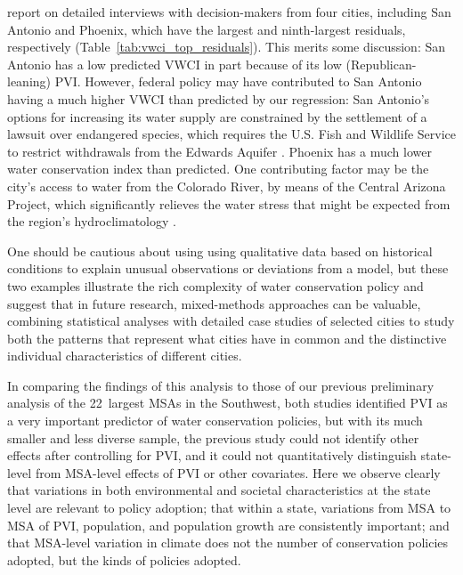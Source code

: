 \documentclass[draft,linenumbers]{agujournal}
\begin{document}
\citet{brown:politics:2016} report on detailed interviews with decision-makers
from four cities, including San Antonio and Phoenix, which have the largest
and ninth-largest residuals, respectively
(Table~\ref{tab:vwci_top_residuals}).
This merits some discussion:
San Antonio has a low predicted VWCI in part
because of its low (Republican-leaning) PVI. However, federal policy may have
contributed to San Antonio having a much higher VWCI than predicted by our
regression: San Antonio's options for increasing its water supply are
constrained by the settlement of a lawsuit over endangered species, which
requires the U.S. Fish and Wildlife Service to restrict withdrawals from the
Edwards Aquifer \citep{brown:politics:2016}.
Phoenix has a much lower water conservation index than predicted.
One contributing factor may be the city's access to water from the Colorado River,
by means of the Central Arizona Project, which significantly relieves the
water stress that might be expected from the region's hydroclimatology
\citep{brown:politics:2016}.

One should be cautious about using using qualitative data based on historical
conditions to explain unusual observations or deviations from a model,
but these two examples illustrate the rich complexity of water conservation
policy and suggest that in future research, mixed-methods approaches
can be valuable, combining statistical analyses with detailed case studies
of selected cities to study both the patterns that represent what cities
have in common and the distinctive individual characteristics of different cities.

In comparing the findings of this analysis to those of our previous preliminary
analysis of the 22~largest MSAs in the Southwest, both studies identified PVI as
a very important predictor of water conservation policies, but with its much
smaller and less diverse sample, the previous study could not identify other
effects after controlling for PVI, and it could not quantitatively distinguish
state-level from MSA-level effects of PVI or other covariates. Here we observe
clearly that variations in both environmental and societal characteristics at
the state level are relevant to policy adoption; that within a state, variations
from MSA to MSA of PVI, population, and population growth are consistently
important; and that MSA-level variation in climate does not
the number of conservation policies adopted, but
the kinds of policies adopted.
\end{document}
